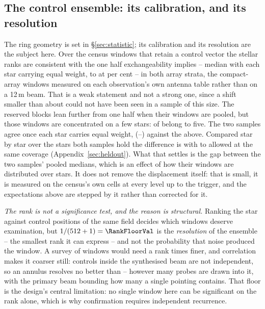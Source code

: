 \subsection{The control ensemble: its calibration, and its resolution}

The ring geometry is set in \S\ref{sec:statistic}; its calibration and its
resolution are the subject here. Over the \VerNTested{} census windows that
retain a control vector the stellar ranks are consistent with the one half
exchangeability implies -- median \BkRankBalSurv{} with each star carrying
equal weight, \BkRankBalSurvLo{} to \BkRankBalSurvHi{} at \CeCovPct{} per
cent -- in both array
strata, the compact-array windows measured on each observation's own antenna
table rather than on a 12\,m beam. That is a weak statement and not a strong
one, since a shift smaller than about \VerKsPowerAca{} could not have been
seen in a sample of this size. The reserved blocks lean further from one half
when their windows are pooled, but those windows are concentrated on a few
stars: \BkRankTopFiveWin{} of \HoWin{} belong to five. The two
samples agree once each star carries equal weight, \BkRankBalHo{}
(\BkRankBalHoLo--\BkRankBalHoHi) against the \BkRankBalSurv{} above.
Compared star by star over the \BkRankPairedStars{} stars both samples hold
the difference is \BkRankPaired{} with \BkRankPairedLo{} to
\BkRankPairedHi{} allowed at the same coverage
(Appendix~\ref{sec:heldout}). What that settles is
the gap between the two samples' pooled medians, which is an effect of how
their windows are distributed over stars. It does not remove the displacement
itself: that is small, it is measured on the census's own cells at every level
up to the trigger, and the expectations above are stepped by it rather than
corrected for it.

\emph{The rank is not a significance test, and the reason is structural.}
Ranking the star against \NCtrl{} control positions of the same field
decides which windows deserve examination, but $1/(\NCtrl+1)=\RankFloorVal$
is the \emph{resolution} of the ensemble -- the smallest rank it can
express -- and not the probability that noise produced the window. A survey
of \NWindows{} windows would need a rank \BonfRankRatio{} times finer, and
correlation makes it coarser still: controls inside the synthesised beam are
not independent, so an annulus resolves no better than
\RankEffLo--\RankEffHi{} however many probes are drawn into it, with the
primary beam bounding how many a single pointing contains. That floor is the
design's central limitation: no single window here can be significant on the
rank alone, which is why confirmation requires independent recurrence.

